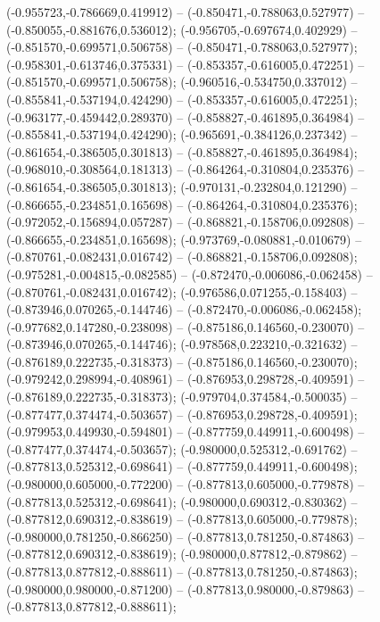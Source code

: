  (-0.955723,-0.786669,0.419912) -- (-0.850471,-0.788063,0.527977) -- (-0.850055,-0.881676,0.536012);
 (-0.956705,-0.697674,0.402929) -- (-0.851570,-0.699571,0.506758) -- (-0.850471,-0.788063,0.527977);
 (-0.958301,-0.613746,0.375331) -- (-0.853357,-0.616005,0.472251) -- (-0.851570,-0.699571,0.506758);
 (-0.960516,-0.534750,0.337012) -- (-0.855841,-0.537194,0.424290) -- (-0.853357,-0.616005,0.472251);
 (-0.963177,-0.459442,0.289370) -- (-0.858827,-0.461895,0.364984) -- (-0.855841,-0.537194,0.424290);
 (-0.965691,-0.384126,0.237342) -- (-0.861654,-0.386505,0.301813) -- (-0.858827,-0.461895,0.364984);
 (-0.968010,-0.308564,0.181313) -- (-0.864264,-0.310804,0.235376) -- (-0.861654,-0.386505,0.301813);
 (-0.970131,-0.232804,0.121290) -- (-0.866655,-0.234851,0.165698) -- (-0.864264,-0.310804,0.235376);
 (-0.972052,-0.156894,0.057287) -- (-0.868821,-0.158706,0.092808) -- (-0.866655,-0.234851,0.165698);
 (-0.973769,-0.080881,-0.010679) -- (-0.870761,-0.082431,0.016742) -- (-0.868821,-0.158706,0.092808);
 (-0.975281,-0.004815,-0.082585) -- (-0.872470,-0.006086,-0.062458) -- (-0.870761,-0.082431,0.016742);
 (-0.976586,0.071255,-0.158403) -- (-0.873946,0.070265,-0.144746) -- (-0.872470,-0.006086,-0.062458);
 (-0.977682,0.147280,-0.238098) -- (-0.875186,0.146560,-0.230070) -- (-0.873946,0.070265,-0.144746);
 (-0.978568,0.223210,-0.321632) -- (-0.876189,0.222735,-0.318373) -- (-0.875186,0.146560,-0.230070);
 (-0.979242,0.298994,-0.408961) -- (-0.876953,0.298728,-0.409591) -- (-0.876189,0.222735,-0.318373);
 (-0.979704,0.374584,-0.500035) -- (-0.877477,0.374474,-0.503657) -- (-0.876953,0.298728,-0.409591);
 (-0.979953,0.449930,-0.594801) -- (-0.877759,0.449911,-0.600498) -- (-0.877477,0.374474,-0.503657);
 (-0.980000,0.525312,-0.691762) -- (-0.877813,0.525312,-0.698641) -- (-0.877759,0.449911,-0.600498);
 (-0.980000,0.605000,-0.772200) -- (-0.877813,0.605000,-0.779878) -- (-0.877813,0.525312,-0.698641);
 (-0.980000,0.690312,-0.830362) -- (-0.877812,0.690312,-0.838619) -- (-0.877813,0.605000,-0.779878);
 (-0.980000,0.781250,-0.866250) -- (-0.877813,0.781250,-0.874863) -- (-0.877812,0.690312,-0.838619);
 (-0.980000,0.877812,-0.879862) -- (-0.877813,0.877812,-0.888611) -- (-0.877813,0.781250,-0.874863);
 (-0.980000,0.980000,-0.871200) -- (-0.877813,0.980000,-0.879863) -- (-0.877813,0.877812,-0.888611);
